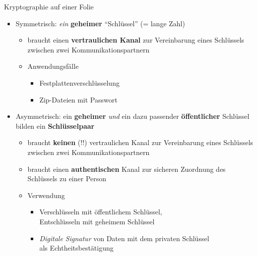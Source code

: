   \begin{frame}{Kryptographie auf einer Folie}
    \begin{itemize}
      \item Symmetrisch: \textit{ein} \textbf{geheimer} ``Schlüssel'' (= lange Zahl)
      \begin{itemize}
        \item braucht einen \textbf{vertraulichen Kanal} zur Vereinbarung eines Schlüssels zwischen zwei Kommunikationspartnern
        \item Anwendungsfälle
        \begin{itemize}
          \item Festplattenverschlüsselung
          \item Zip-Dateien mit Passwort
        \end{itemize}
      \end{itemize}
      \item Asymmetrisch: ein \textbf{geheimer} \textit{und} ein dazu passender \textbf{öffentlicher} Schlüssel bilden ein \textbf{Schlüsselpaar}
      \begin{itemize}
        \item braucht \textbf{keinen} (!!) vertraulichen Kanal zur Vereinbarung eines Schlüssels zwischen zwei Kommunikationspartnern
	\item braucht einen \textbf{authentischen} Kanal zur sicheren Zuordnung des Schlüssels zu einer Person
        \item Verwendung
          \begin{itemize}
            \item Verschlüsseln mit öffentlichem Schlüssel,\\Entschlüsseln mit geheimem Schlüssel
            \item \textit{Digitale Signatur} von Daten mit dem privaten Schlüssel\\als Echtheitsbestätigung
          \end{itemize}
      \end{itemize}
    \end{itemize}
  \end{frame}


